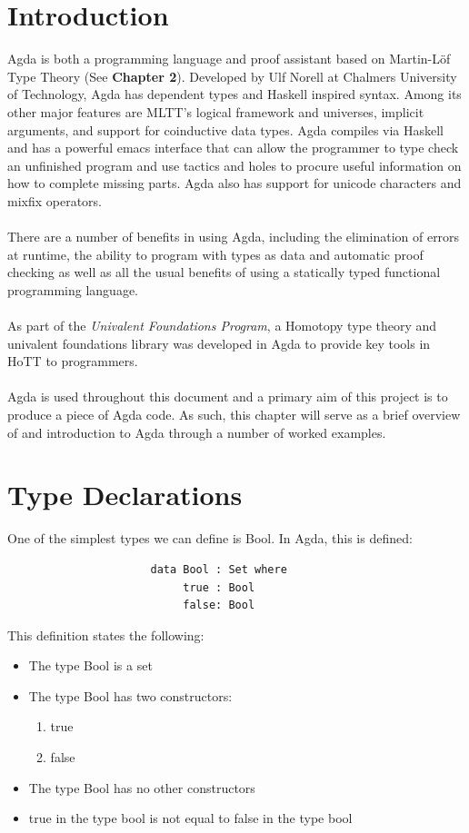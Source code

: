 \documentclass[12pt]{report}
\begin{document}
\section{Introduction}
Agda is both a programming language and proof assistant based on Martin-L\"of Type Theory (See \textbf{Chapter 2}). Developed by Ulf Norell at Chalmers University of Technology, Agda has dependent types and Haskell inspired syntax. Among its other major features are MLTT's logical framework and universes, implicit arguments, and support for coinductive data types. Agda compiles via Haskell and has a powerful emacs interface that can allow the programmer to type check an unfinished program and use tactics and holes to procure useful information on how to complete missing parts. Agda also has support for unicode characters and mixfix operators.\\
\\
There are a number of benefits in using Agda, including the elimination of errors at runtime, the ability to program with types as data and automatic proof checking as well as all the usual benefits of using a statically typed functional programming language. \\
\\
As part of the \textit{Univalent Foundations Program}, a Homotopy type theory and univalent foundations library was developed in Agda to provide key tools in HoTT to programmers\cite{hottagda}. \\
\\
Agda is used throughout this document and a primary aim of this project is to produce a piece of Agda code. As such, this chapter will serve as a brief overview of and introduction to Agda through a number of worked examples.

\newpage
\section{Type Declarations}
One of the simplest types we can define is Bool. In Agda, this is defined:
\begin{verbatim}
                      data Bool : Set where
                           true : Bool
                           false: Bool

\end{verbatim}

This definition states the following:
\begin{itemize}
\item The type Bool is a set
\item The type Bool has two constructors: \begin{enumerate} \item true \item false \end{enumerate}
\item The type Bool has no other constructors
\item true in the type bool is not equal to false in the type bool
\end{itemize}
\end{document}
